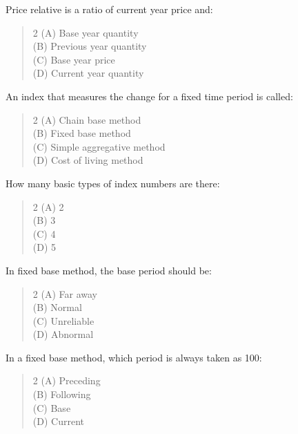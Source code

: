 \documentclass[11pt,a4paper]{article}
\begin{document}
\begin{mcqlist}
\item Price relative is a ratio of current year price and:
\begin{quote}\begin{multicols}{2}
\noindent (A) Base year quantity \\
(B) Previous year quantity \\
(C) Base year price \\
(D) Current year quantity
\end{multicols}\end{quote}

\item An index that measures the change for a fixed time period is called:
\begin{quote}\begin{multicols}{2}
\noindent (A) Chain base method \\
(B) Fixed base method \\
(C) Simple aggregative method \\
(D) Cost of living method
\end{multicols}\end{quote}

\item How many basic types of index numbers are there:
\begin{quote}\begin{multicols}{2}
\noindent (A) 2 \\
(B) 3 \\
(C) 4 \\
(D) 5
\end{multicols}\end{quote}

\item In fixed base method, the base period should be:
\begin{quote}\begin{multicols}{2}
\noindent (A) Far away \\
(B) Normal \\
(C) Unreliable \\
(D) Abnormal
\end{multicols}\end{quote}

\item In a fixed base method, which period is always taken as 100:
\begin{quote}\begin{multicols}{2}
\noindent (A) Preceding \\
(B) Following \\
(C) Base \\
(D) Current
\end{multicols}\end{quote}


\end{mcqlist}
\end{document}
